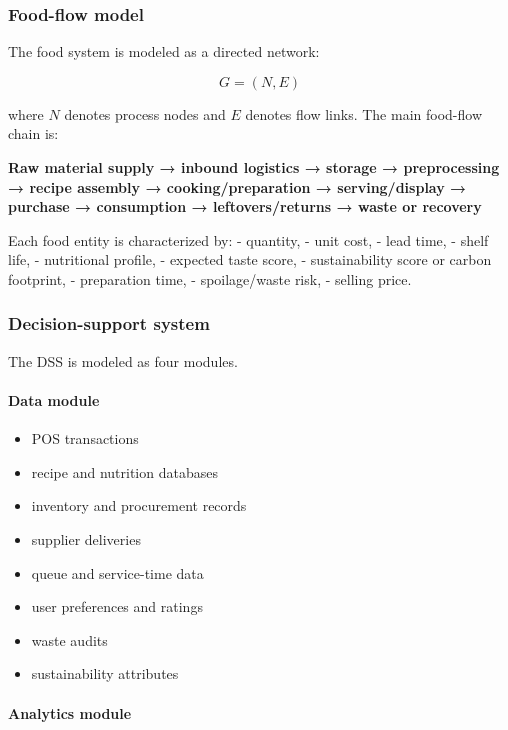 \documentclass[journal]{IEEEtran}
\begin{document}
\subsubsection{Food-flow model}\label{food-flow-model}

The food system is modeled as a directed network:

\[G = (N,E)\]

where \(N\) denotes process nodes and \(E\) denotes flow links. The main
food-flow chain is:

\textbf{Raw material supply → inbound logistics → storage →
preprocessing → recipe assembly → cooking/preparation → serving/display
→ purchase → consumption → leftovers/returns → waste or recovery}

Each food entity is characterized by: - quantity, - unit cost, - lead
time, - shelf life, - nutritional profile, - expected taste score, -
sustainability score or carbon footprint, - preparation time, -
spoilage/waste risk, - selling price.

\subsubsection{Decision-support system}\label{decision-support-system}

The DSS is modeled as four modules.

\paragraph{Data module}\label{data-module}

\begin{itemize}
\tightlist
\item
  POS transactions
\item
  recipe and nutrition databases
\item
  inventory and procurement records
\item
  supplier deliveries
\item
  queue and service-time data
\item
  user preferences and ratings
\item
  waste audits
\item
  sustainability attributes
\end{itemize}

\paragraph{Analytics module}\label{analytics-module}
\end{document}
